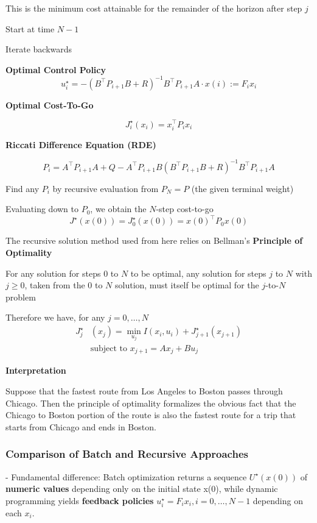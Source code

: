 This is the minimum cost attainable for the remainder
of the horizon after step $j$

Start at time $N-1$


Iterate backwards

\textbf{Optimal Control Policy}
\[
	u_i^\star =
	-(B^\top P_{i+1}B + R)^{-1}
	B^\top P_{i+1} A \cdot x(i)
	:= F_i x_i
\]

\textbf{Optimal Cost-To-Go}

\[
	J_i^\star(x_i) = x_i^\top P_i x_i
\]


\textbf{Riccati Difference Equation (RDE)}

\[
	\scriptstyle
	P_i = A^\top P_{i+1} A
	+ Q - A^\top P_{i+1} B
	(B^\top P_{i+1} B + R)^{-1}
	B^\top P_{i+1} A
\]

Find any $P_i$ by recursive evaluation from
$P_N = P$ (the given terminal weight)

Evaluating down to $P_0$, we obtain the $N$-step cost-to-go
\[
	J^\star(x(0)) = J_0^\star(x(0))=x(0)^\top P_0 x(0)
\]

The recursive solution method used from here relies on
Bellman’s \textbf{Principle of Optimality}

For any solution for steps $0$ to $N$ to be optimal,
any solution for steps $j$ to $N$ with $j\ge0$,
taken from the $0$ to $N$ solution,
must itself be optimal for the $j$-to-$N$ problem

Therefore we have, for any $j = 0,\dots,N$
\[\begin{aligned}
		J_j^\star & (x_j) = \min_{u_j}
		I(x_i,u_i) +J_{j+1}^\star(x_{j+1})
		\\
		          & \text{subject to  }
		x_{j+1}     = Ax_j+Bu_j
	\end{aligned} \]

\textbf{Interpretation}

Suppose that the fastest route from Los Angeles to Boston
passes through Chicago. Then the principle of optimality
formalizes the obvious fact that the Chicago to Boston
portion of the route is also the fastest route for a trip
that starts from Chicago and ends in Boston.

\subsubsection{Comparison of Batch and Recursive Approaches}

- Fundamental difference:
Batch optimization returns a sequence $U^\star(x(0))$
of \textbf{numeric values} depending only on the initial state x(0),
while dynamic programming yields \textbf{feedback policies}
$u_i^\star = F_i x_i, i = 0,\dots,N-1$ depending on each $x_i$.

